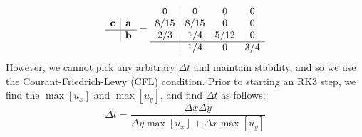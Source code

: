 \documentclass[12pt, reqno]{amsart}
\begin{document}
\begin{equation}
    \begin{array}{c | c}
        \mathbf{c} & \mathbf{a} \\
        \hline
        & \mathbf{b}
    \end{array} = \begin{array}{c | cccc }
        0 & 0 & 0 & 0 \\
        8/15 & 8/15 & 0 & 0\\
        2/3 & 1/4 & 5/12 & 0\\
        \hline
            & 1/4 & 0 & 3/4
    \end{array}
\end{equation}
However, we cannot pick any arbitrary $\Delta t$ and maintain stability, and so we use the Courant-Friedrich-Lewy (CFL) condition. Prior to starting an RK3 step, we find the $\max \left[ u_x \right]$ and $\max \left[ u_y \right]$, and find $\Delta t$ as follows:
\begin{equation}
    \Delta t = \frac{\Delta x \Delta y}{\Delta y \max \left[ u_x \right] + \Delta x \max \left[ u_y \right]}
\end{equation}
\end{document}

